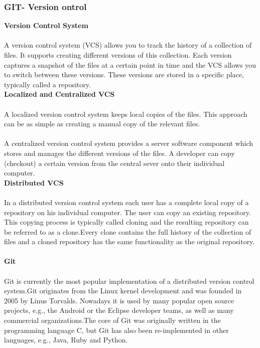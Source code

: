 \documentclass[a4paper, 12pt]{report}
\begin{document}
\subsubsection{GIT- Version ontrol}
\fontsize{12pt}{12pt}\selectfont
\textbf{Version Control System}
\paragraph{} A version control system (VCS) allows you to track the history of a collection of files. It supports creating different versions of this collection. Each version captures a snapshot of the files at a certain point in time and the VCS allows you to switch between these versions. These versions are stored in a specific place, typically called a repository.\newline 
\\
\textbf{Localized and Centralized VCS}
\paragraph*{} A localized version control system keeps local copies of the files. This approach can be as simple as creating a manual copy of the relevant files.
\paragraph*{}
A centralized version control system provides a server software component which stores and manages the different versions of the files. A developer can copy (checkout) a certain version from the central sever onto their individual computer.
\\

\textbf{Distributed VCS}
\paragraph*{} In a distributed version control system each user has a complete local copy of a repository on his individual computer. The user can copy an existing repository. This copying process is typically called cloning and the resulting repository can be referred to as a clone.Every clone contains the full history of the collection of files and a cloned repository has the same functionality as the original repository. \\\\
\textbf{Git}
\paragraph*{}
Git is currently the most popular implementation of a distributed version control system.Git originates from the Linux kernel development and was founded in 2005 by Linus Torvalds. Nowadays it is used by many popular open source projects, e.g., the Android or the Eclipse developer teams, as well as many commercial organizations.The core of Git was originally written in the programming language C, but Git has also been re-implemented in other languages, e.g., Java, Ruby and Python.
\newpage
\end{document}
